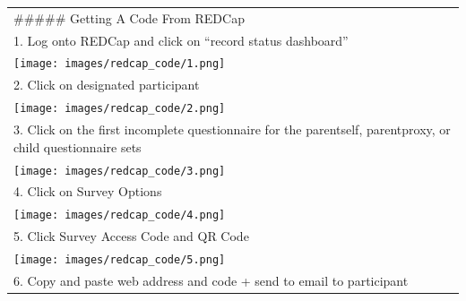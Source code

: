 \documentclass[
]{book}
\begin{document}
\begin{longtable}[]{@{}l@{}}
\toprule
\endhead
\begin{minipage}[t]{0.23\columnwidth}\raggedright
\#\#\#\#\# Getting A Code From REDCap\strut
\end{minipage}\tabularnewline
\begin{minipage}[t]{0.23\columnwidth}\raggedright
1. Log onto REDCap and click on ``record status dashboard''\strut
\end{minipage}\tabularnewline
\begin{minipage}[t]{0.23\columnwidth}\raggedright
\texttt{[image: images/redcap\_code/1.png]}\strut
\end{minipage}\tabularnewline
\begin{minipage}[t]{0.23\columnwidth}\raggedright
2. Click on designated participant\strut
\end{minipage}\tabularnewline
\begin{minipage}[t]{0.23\columnwidth}\raggedright
\texttt{[image: images/redcap\_code/2.png]}\strut
\end{minipage}\tabularnewline
\begin{minipage}[t]{0.23\columnwidth}\raggedright
3. Click on the first incomplete questionnaire for the parentself, parentproxy, or child questionnaire sets\strut
\end{minipage}\tabularnewline
\begin{minipage}[t]{0.23\columnwidth}\raggedright
\texttt{[image: images/redcap\_code/3.png]}\strut
\end{minipage}\tabularnewline
\begin{minipage}[t]{0.23\columnwidth}\raggedright
4. Click on Survey Options\strut
\end{minipage}\tabularnewline
\begin{minipage}[t]{0.23\columnwidth}\raggedright
\texttt{[image: images/redcap\_code/4.png]}\strut
\end{minipage}\tabularnewline
\begin{minipage}[t]{0.23\columnwidth}\raggedright
5. Click Survey Access Code and QR Code\strut
\end{minipage}\tabularnewline
\begin{minipage}[t]{0.23\columnwidth}\raggedright
\texttt{[image: images/redcap\_code/5.png]}\strut
\end{minipage}\tabularnewline
\begin{minipage}[t]{0.23\columnwidth}\raggedright
6. Copy and paste web address and code + send to email to participant\strut
\end{minipage}\tabularnewline
\bottomrule
\end{longtable}
\end{document}
